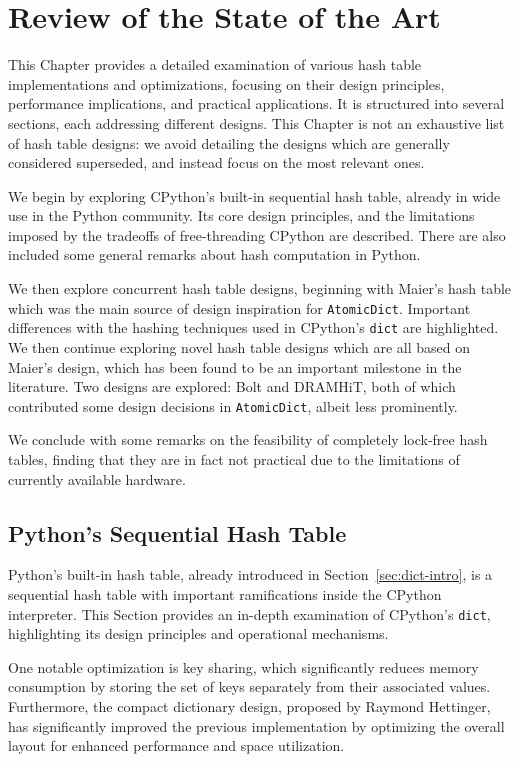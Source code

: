 \chapter{Review of the State of the Art}\label{ch:review}

This Chapter provides a detailed examination of various hash table implementations and optimizations, focusing on their design principles, performance implications, and practical applications.
It is structured into several sections, each addressing different designs.
This Chapter is not an exhaustive list of hash table designs: we avoid detailing the designs which are generally considered superseded, and instead focus on the most relevant ones.

We begin by exploring CPython's built-in sequential hash table, already in wide use in the Python community.
Its core design principles, and the limitations imposed by the tradeoffs of free-threading CPython are described.
There are also included some general remarks about hash computation in Python.

We then explore concurrent hash table designs, beginning with Maier's hash table which was the main source of design inspiration for \texttt{AtomicDict}.
Important differences with the hashing techniques used in CPython's \texttt{dict} are highlighted.
We then continue exploring novel hash table designs which are all based on Maier's design, which has been found to be an important milestone in the literature.
Two designs are explored: Bolt and DRAMHiT, both of which contributed some design decisions in \texttt{AtomicDict}, albeit less prominently.

We conclude with some remarks on the feasibility of completely lock-free hash tables, finding that they are in fact not practical due to the limitations of currently available hardware.


\section{Python's Sequential Hash Table}\label{sec:python-dict-review}

Python's built-in hash table, already introduced in Section~\ref{sec:dict-intro}, is a sequential hash table with important ramifications inside the CPython interpreter.
This Section provides an in-depth examination of CPython's \texttt{dict}, highlighting its design principles and operational mechanisms.

One notable optimization is key sharing, which significantly reduces memory consumption by storing the set of keys separately from their associated values.
Furthermore, the compact dictionary design, proposed by Raymond Hettinger, has significantly improved the previous implementation by optimizing the overall layout for enhanced performance and space utilization.

